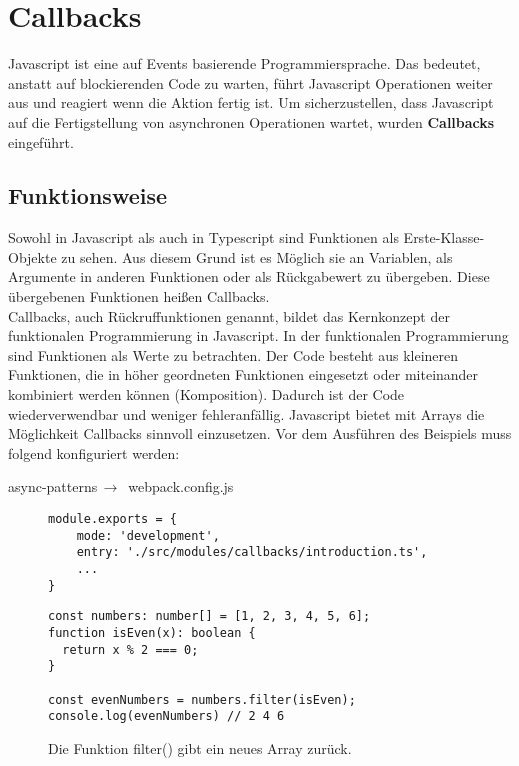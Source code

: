 \section{Callbacks}
Javascript ist eine auf Events basierende Programmiersprache. Das bedeutet, anstatt auf blockierenden Code zu warten, führt Javascript Operationen weiter aus und reagiert wenn die Aktion fertig ist. Um sicherzustellen, dass Javascript auf die Fertigstellung von asynchronen Operationen wartet, wurden \textbf{Callbacks} eingeführt.

\subsection{Funktionsweise}

Sowohl in Javascript als auch in Typescript sind Funktionen als Erste-Klasse-Objekte zu sehen. Aus diesem Grund ist es Möglich sie an Variablen, als Argumente in anderen Funktionen oder als Rückgabewert zu übergeben. Diese übergebenen Funktionen heißen Callbacks.\\

\noindent
Callbacks, auch Rückruffunktionen genannt, bildet das Kernkonzept der funktionalen Programmierung in Javascript.\cite{callbacks-intro} In der funktionalen Programmierung sind Funktionen als Werte zu betrachten. Der Code besteht aus kleineren Funktionen, die in höher geordneten Funktionen eingesetzt oder miteinander kombiniert werden können (Komposition). Dadurch ist der Code wiederverwendbar und weniger fehleranfällig. Javascript bietet mit Arrays die Möglichkeit Callbacks sinnvoll einzusetzen. Vor dem Ausführen des Beispiels muss folgend konfiguriert werden:

\begin{center}
    async-patterns$\,\to\,$ webpack.config.js
\end{center}

\begin{figure}[H]
\begin{lstlisting}[basicstyle=\small]
module.exports = {
    mode: 'development',
    entry: './src/modules/callbacks/introduction.ts',
    ...
}
\end{lstlisting}
\end{figure}

\begin{figure}[H]
\begin{lstlisting}[basicstyle=\small]
const numbers: number[] = [1, 2, 3, 4, 5, 6];
function isEven(x): boolean { 
  return x % 2 === 0; 
}

const evenNumbers = numbers.filter(isEven);
console.log(evenNumbers) // 2 4 6
\end{lstlisting}
\caption{Die Funktion filter() gibt ein neues Array zurück.}
\end{figure}

